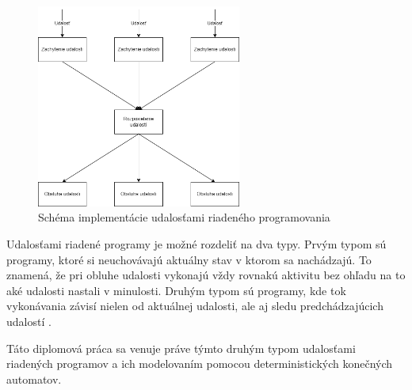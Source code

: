 \begin{figure}[!htbp]
  \centering
  \includegraphics[width=0.60\textwidth]{img/event-driven-schema.png}
  \caption{Schéma implementácie udalosťami riadeného programovania}
  \label{figure:event-driven-schema}
\end{figure}

\par
Udalosťami riadené programy je možné rozdeliť na dva typy. Prvým typom sú programy, ktoré si neuchovávajú aktuálny stav v ktorom sa nachádzajú. To znamená, že pri obluhe udalosti vykonajú vždy rovnakú aktivitu bez ohľadu na to aké udalosti nastali v minulosti. Druhým typom sú programy, kde tok vykonávania závisí nielen od aktuálnej udalosti, ale aj sledu predchádzajúcich udalostí \cite{dashEventDrivenProgramming2011}. 
\par Táto diplomová práca sa venuje práve týmto druhým typom udalosťami riadených programov a ich modelovaním pomocou deterministických konečných automatov.